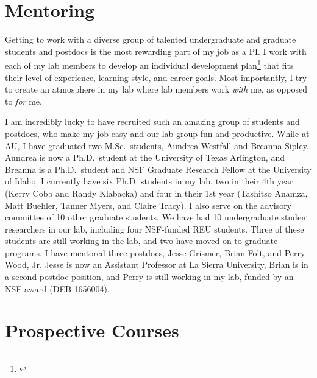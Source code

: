 \section*{Mentoring}
Getting to work with a diverse group of talented undergraduate and graduate
students and postdocs is the most rewarding part of my job as a PI.
I work with each of my lab members to develop an individual development
plan\footnote{\label{idp}} that fits
their level of experience, learning style, and career goals.
Most importantly, I try to create an atmosphere in my lab where
lab members work \emph{with} me, as opposed to \emph{for} me.

I am incredibly lucky to have recruited such an amazing group of students and
postdocs, who make my job easy and our lab group fun and productive.
While at AU, I have graduated two M.Sc.\ students, Aundrea Westfall
and Breanna Sipley.
Aundrea is now a Ph.D.\ student at the University of Texas Arlington,
and
Breanna is a Ph.D.\ student and NSF Graduate Research Fellow at the University
of Idaho.
I currently have six Ph.D. students in my lab, two in their 4th
year (Kerry Cobb and Randy Klabacka) and four in their 1st year
(Tashitso Anamza, Matt Buehler, Tanner Myers, and Claire Tracy).
I also serve on the advisory committee of 10 other graduate students.
We have had 10 undergraduate student researchers in our lab, including four
NSF-funded REU students.
Three of these students are still working in the lab,
and two have moved on to graduate programs.
I have mentored three postdocs, Jesse Grismer, Brian Folt, and Perry Wood, Jr.
Jesse is now an Assistant Professor at La Sierra University,
Brian is in a second postdoc position,
and Perry is still working in my lab, funded by an NSF award
(\href{https://www.nsf.gov/awardsearch/showAward?AWD_ID=1656004&HistoricalAwards=false}{DEB 1656004}).


\section*{Prospective Courses}


